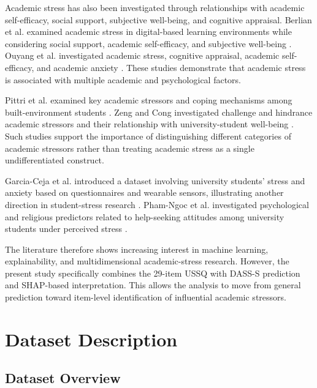 \documentclass[conference]{IEEEtran}
\begin{document}
Academic stress has also been investigated through relationships with academic self-efficacy, social support, subjective well-being, and cognitive appraisal. Berlian et al. examined academic stress in digital-based learning environments while considering social support, academic self-efficacy, and subjective well-being \cite{berlian2026}. Ouyang et al. investigated academic stress, cognitive appraisal, academic self-efficacy, and academic anxiety \cite{ouyang2026}. These studies demonstrate that academic stress is associated with multiple academic and psychological factors.

Pittri et al. examined key academic stressors and coping mechanisms among built-environment students \cite{pittri2026}. Zeng and Cong investigated challenge and hindrance academic stressors and their relationship with university-student well-being \cite{zeng2025}. Such studies support the importance of distinguishing different categories of academic stressors rather than treating academic stress as a single undifferentiated construct.

Garcia-Ceja et al. introduced a dataset involving university students' stress and anxiety based on questionnaires and wearable sensors, illustrating another direction in student-stress research \cite{garciaceja2026}. Pham-Ngoc et al. investigated psychological and religious predictors related to help-seeking attitudes among university students under perceived stress \cite{phamngoc2026}.

The literature therefore shows increasing interest in machine learning, explainability, and multidimensional academic-stress research. However, the present study specifically combines the 29-item USSQ with DASS-S prediction and SHAP-based interpretation. This allows the analysis to move from general prediction toward item-level identification of influential academic stressors.


\section{Dataset Description}

\subsection{Dataset Overview}
\end{document}
